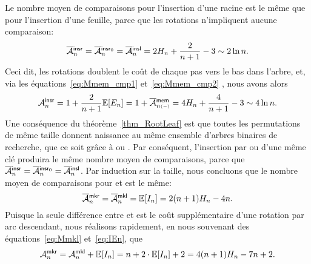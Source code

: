 Le nombre moyen de comparaisons pour l'insertion d'une racine est le
même que pour l'insertion d'une feuille, parce que les rotations
n'impliquent aucune comparaison:
\begin{equation*}
\OM{\fun{insr}}{n} = \OM{\fun{insr}_0}{n} = \OM{\fun{insl}}{n}
= 2H_n + \frac{2}{n+1} - 3 \sim 2\ln n.
\index{insr@$\OM{\fun{insr}}{n}$}
\index{insr0@$\OM{\fun{insr}_0}{n}$}
\end{equation*}
Ceci dit, les rotations doublent le coût de chaque pas vers le bas
dans l'arbre, et, via les équations~\eqref{eq:Mmem_cmp1}
et~\eqref{eq:Mmem_cmp2} , nous avons alors
\begin{equation*}
\M{\fun{insr}}{n} = 1 + \frac{2}{n+1}\Expected{E_n} = 1 +
\OM{\fun{mem}}{n{\scriptscriptstyle(-)}} = 4H_n + \frac{4}{n+1} - 3
\sim 4\ln n.
\index{insr@$\M{\fun{insr}}{n}$}
\end{equation*}
Une conséquence du théorème~\eqref{thm_RootLeaf}
 est que toutes les permutations de même taille
donnent naissance au même ensemble d'arbres binaires de recherche, que
ce soit grâce à  ou . Par conséquent,
l'insertion par  ou  d'une même clé produira
le même nombre moyen de comparaisons, parce que \(\OM{\fun{insr}}{n} =
\OM{\fun{insr}_0}{n} = \OM{\fun{insl}}{n}\). Par induction sur la
taille, nous concluons que le nombre moyen de comparaisons pour
 et  est le même:
\begin{equation*}
\OM{\fun{mkr}}{n} = \OM{\fun{mkl}}{n} = \Expected{I_n}
= 2(n+1)H_n - 4n.
\index{mkr@$\OM{\fun{mkr}}{n}$}
\end{equation*}
Puisque la seule différence entre  et  est le
coût supplémentaire d'une rotation par arc descendant, nous réalisons
rapidement, en nous souvenant des équations~\eqref{eq:Mmkl}
et~\eqref{eq:IEn}, que
\begin{equation*}
\M{\fun{mkr}}{n} = \M{\fun{mkl}}{n} + \Expected{I_n}
= n + 2 \cdot \Expected{I_n} + 2 = 4(n+1)H_n - 7n + 2.
\index{mkr@$\M{\fun{mkr}}{n}$}
\end{equation*}


